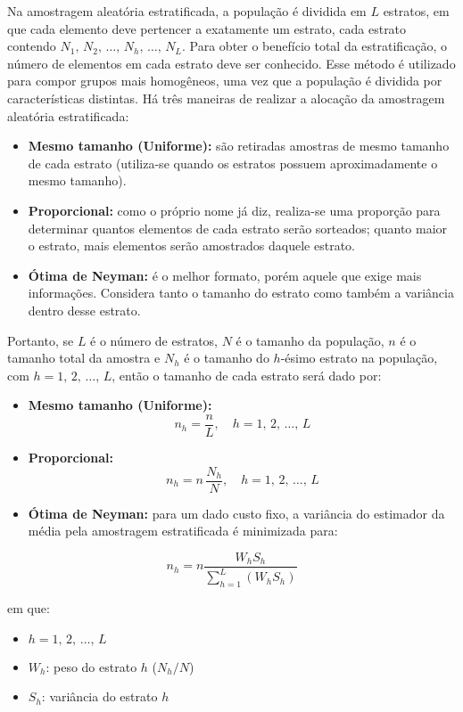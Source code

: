 \documentclass[
  portuguese,
]{estat/estat}
\providecommand{\tightlist}{%
  \setlength{\itemsep}{0pt}\setlength{\parskip}{0pt}}
\begin{document}
Na amostragem aleatória estratificada, a população é dividida em \(L\)
estratos, em que cada elemento deve pertencer a exatamente um estrato,
cada estrato contendo
\(N_1, \, N_2, \, \ldots, \, N_h, \, \ldots, \, N_L\). Para obter o
benefício total da estratificação, o número de elementos em cada estrato
deve ser conhecido. Esse método é utilizado para compor grupos mais
homogêneos, uma vez que a população é dividida por características
distintas. Há três maneiras de realizar a alocação da amostragem
aleatória estratificada:

\begin{itemize}
\tightlist
\item
  \textbf{Mesmo tamanho (Uniforme):} são retiradas amostras de mesmo
  tamanho de cada estrato (utiliza-se quando os estratos possuem
  aproximadamente o mesmo tamanho).
\item
  \textbf{Proporcional:} como o próprio nome já diz, realiza-se uma
  proporção para determinar quantos elementos de cada estrato serão
  sorteados; quanto maior o estrato, mais elementos serão amostrados
  daquele estrato.
\item
  \textbf{Ótima de Neyman:} é o melhor formato, porém aquele que exige
  mais informações. Considera tanto o tamanho do estrato como também a
  variância dentro desse estrato.
\end{itemize}

Portanto, se \(L\) é o número de estratos, \(N\) é o tamanho da
população, \(n\) é o tamanho total da amostra e \(N_h\) é o tamanho do
\(h\)-ésimo estrato na população, com \(h=1, \, 2, \, \ldots, \, L\),
então o tamanho de cada estrato será dado por:

\begin{itemize}
\tightlist
\item
  \textbf{Mesmo tamanho (Uniforme):} \[
  n_h = \frac{n}{L} , \quad h=1, \, 2, \, \ldots, \, L 
  \]
\item
  \textbf{Proporcional:} \[
  n_h = n \, \frac{N_h}{N} , \quad h=1, \, 2, \, \ldots, \, L 
  \]
\item
  \textbf{Ótima de Neyman:} para um dado custo fixo, a variância do
  estimador da média pela amostragem estratificada é minimizada para:
\end{itemize}

\[
n_h = n \frac{W_h S_h}{\sum_{h=1}^{L} (W_h S_h)}
\]

em que:

\begin{itemize}
\tightlist
\item
  \(h=1, \, 2, \, \ldots, \, L\)
\item
  \(W_h\): peso do estrato \(h\) (\(N_h/N\))
\item
  \(S_h\): variância do estrato \(h\)
\end{itemize}
\end{document}
